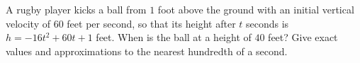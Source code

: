 A rugby player kicks a ball from $1$ foot above the ground with an initial vertical velocity of $60$ feet per second, so that its height after $t$ seconds is $h=-16t^2+60t+1$ feet. When is the ball at a height of $40$ feet? Give exact values and approximations to the nearest hundredth of a second.
